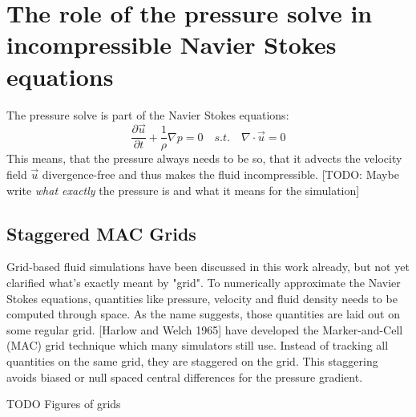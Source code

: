 \section{The role of the pressure solve in incompressible Navier Stokes equations}
The pressure solve is part of the Navier Stokes equations:
\begin{equation} \label{navier-stokes-pressure}
    \frac{\partial \vec{u}}{\partial t} + \frac{1}{\rho}  \nabla p = 0 \quad s.t. \quad \nabla \cdot \vec{u} = 0
\end{equation}
This means, that the pressure always needs to be so, that it advects the velocity field $\vec{u}$ divergence-free and thus makes the fluid incompressible.  [TODO: Maybe write \textit{what exactly} the pressure is and what it means for the simulation]

\subsection{Staggered MAC Grids}
Grid-based fluid simulations have been discussed in this work already, but not yet clarified what's exactly meant by "grid". To numerically approximate the Navier Stokes equations, quantities like pressure, velocity and fluid density needs to be computed through space. As the name suggests, those quantities are laid out on some regular grid. [Harlow and Welch 1965] have developed the Marker-and-Cell (MAC) grid technique which many simulators still use. Instead of tracking all quantities on the same grid, they are staggered on the grid. This staggering avoids biased or null spaced central differences for the pressure gradient. 
\par TODO Figures of grids 

